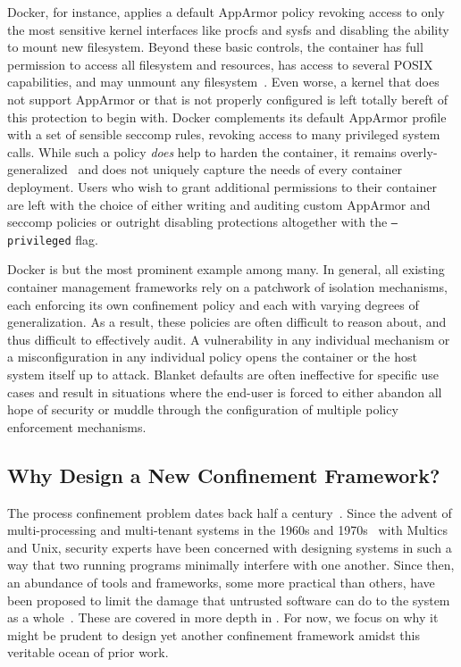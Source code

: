 Docker, for instance, applies a default AppArmor policy revoking access to only the most
sensitive kernel interfaces like procfs and sysfs and disabling the ability to mount new
filesystem.  Beyond these basic controls, the container has full permission to access all
filesystem and resources, has access to several POSIX capabilities, and may unmount any
filesystem~\cite{docker_apparmor, docker_default_apparmor}. Even worse, a kernel that does
not support AppArmor or that is not properly configured is left totally bereft of this
protection to begin with. Docker complements its default AppArmor profile with a set of
sensible seccomp rules, revoking access to many privileged system calls. While such
a policy \textit{does} help to harden the container, it remains
overly-generalized~\cite{sultan2019_container_security} and does not uniquely capture the
needs of every container deployment. Users who wish to grant additional permissions to
their container are left with the choice of either writing and auditing custom AppArmor
and seccomp policies or outright disabling protections altogether with the
\texttt{--privileged} flag.

Docker is but the most prominent example among many. In general, all existing container
management frameworks rely on a patchwork of isolation mechanisms, each enforcing its own
confinement policy and each with varying degrees of generalization. As a result, these
policies are often difficult to reason about, and thus difficult to effectively audit.
A vulnerability in any individual mechanism or a misconfiguration in any individual policy
opens the container or the host system itself up to attack. Blanket defaults are often
ineffective for specific use cases and result in situations where the end-user is forced to
either abandon all hope of security or muddle through the configuration of multiple policy
enforcement mechanisms.

\subsection{Why Design a New Confinement Framework?}%
\label{ss:why-new}

The process confinement problem dates back half a century~\cite{lampson1973_confinement}.
Since the advent of multi-processing and multi-tenant systems in the 1960s and
1970s~\cite{vyssotsky1965_multics, corbato1965_multics, ritchie1974_unix} with Multics and
Unix, security experts have been concerned with designing systems in such a way that two
running programs minimally interfere with one another. Since then, an abundance of tools
and frameworks, some more practical than others, have been proposed to limit the damage
that untrusted software can do to the system as
a whole~\cite{shu2016_security_isolation_study}. These are covered in more depth in
. For now, we focus on why it might be prudent to design yet another
confinement framework amidst this veritable ocean of prior work.

